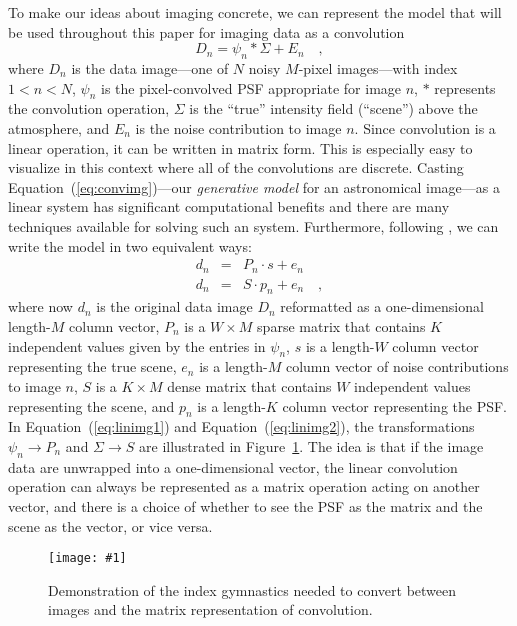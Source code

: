 \documentclass[12pt,preprint]{aastex}
\newcommand{\Fig}[1]{Figure~\ref{fig:#1}}
\newcommand{\fig}[1]{\Fig{#1}}
\newcommand{\figlabel}[1]{\label{fig:#1}}
\newcommand{\Eq}[1]{Equation~(\ref{eq:#1})}
\newcommand{\eq}[1]{\Eq{#1}}
\newcommand{\eqlabel}[1]{\label{eq:#1}}
\newcommand{\data}{\ensuremath{D}}
\newcommand{\scene}{\ensuremath{\Sigma}}
\newcommand{\psf}{\ensuremath{\psi}}
\newcommand{\dvec}{\ensuremath{d}}
\newcommand{\evec}{\ensuremath{e}}
\newcommand{\svec}{\ensuremath{s}}
\newcommand{\smat}{\ensuremath{S}}
\newcommand{\pvec}{\ensuremath{p}}
\newcommand{\pmat}{\ensuremath{P}}
\newcommand{\dfmplot}[1]{%
\begin{center}%
    \texttt{[image: \#1]}%
\end{center}%
}
\begin{document}
To make our ideas about imaging concrete, we can represent the model
that will be used throughout this paper for imaging data as a
convolution
\begin{equation}\eqlabel{convimg}
    \data_n = \psf_n \ast \scene + E_n \quad,
\end{equation}
where $\data_n$ is the data image---one of $N$ noisy $M$-pixel
images---with index $1<n<N$, $\psf_n$ is the pixel-convolved PSF
appropriate for image $n$, $\ast$ represents the convolution
operation, $\scene$ is the ``true'' intensity field (``scene'') above
the atmosphere, and $E_n$ is the noise contribution to image $n$.
Since convolution is a linear operation, it can be written in matrix
form. This is especially easy to visualize in this context where all of
the convolutions are discrete. Casting \eq{convimg}---our
\emph{generative model} for an astronomical image---as a linear system
has significant computational benefits and there are many techniques
available for solving such an system. Furthermore, following
\citet{hirsch}, we can write the model in two equivalent ways:
\begin{eqnarray}\displaystyle
\dvec_n &=& \pmat_n \cdot \svec + \evec_n \eqlabel{linimg1}
\\
\dvec_n &=& \smat \cdot \pvec_n + \evec_n \eqlabel{linimg2}
\quad ,
\end{eqnarray}
where now $\dvec_n$ is the original data image $\data_n$ reformatted as a
one-dimensional length-$M$ column vector, $\pmat_n$ is a $W\times M$
sparse matrix that contains $K$ independent values given by the entries
in $\psf_n$, $s$ is a length-$W$ column vector representing the true
scene, $\evec_n$ is a length-$M$ column vector of noise contributions to
image $n$, $\smat$ is a $K\times M$ dense matrix that contains $W$
independent values representing the scene, and $\pvec_n$ is a length-$K$
column vector representing the PSF\@. In \eq{linimg1} and \eq{linimg2},
the transformations
$\psf_n \to \pmat_n$ and $\scene \to \smat$ are illustrated in \fig{index}.
The idea is that if the image data are unwrapped into a
one-dimensional vector, the linear convolution operation can always be
represented as a matrix operation acting on another vector, and there
is a choice of whether to see the PSF as the matrix and the scene as
the vector, or vice versa.

\begin{figure}[!htbp]
    \dfmplot{index_gymnastics.pdf}
    \caption{Demonstration of the index gymnastics needed to convert between
        images and the matrix representation of convolution.\figlabel{index}}
\end{figure}
\end{document}
